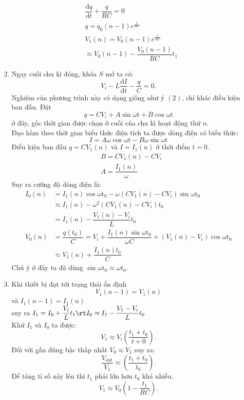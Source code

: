 \begin{loigiai}
\begin{enumerate}[1) ]
\begin{align*}
        &\dfrac{\mathrm{d}q}{\mathrm{d}t}+\dfrac{q}{RC}=0\\
        &q=q_0(n-1)e^{\frac{t}{RC}}\\
        &V_1(n)=V_0(n-1)e^{\frac{t}{RC}}\\
        &\approx V_0(n-1)-\dfrac{V_0(n-1)}{RC}t_1
    \end{align*}
    \item Ngay cuối chu kì đóng, khóa $S$ mở ta có:
    \[V_{i}-L\dfrac{\mathrm{d}I}{\mathrm{d}t}-\dfrac{q}{C}=0.\]
    Nghiệm của phương trình này có dạng giống như ý $(2)$, chỉ khác điều kiện ban đầu. Đặt
    \[q=CV_{i}+A\mathrm{\sin{\omega t}}+B\mathrm{\cos{\omega t}}\]
    ở đây, gốc thời gian được chọn ở cuối của chu kì hoạt động thứ $n$.\\
    Đạo hàm theo thời gian biểu thức điện tích ta được dòng điện có biểu thức:
    \[I=A\omega\mathrm{\cos{\omega t}}-B\omega\mathrm{\sin{\omega t}}\]
    Điều kiện ban đầu $q=CV_{1}(n)$ và $I=I_1(n)$ ở thời điểm $t=0$.
    \begin{align*}
        &B=CV_1(n)-CV_{i}\\
        &A=\dfrac{I_1(n)}{\omega}
    \end{align*}
    Suy ra cường độ dòng điện là:
    \begin{align*}
        I_0(n)&=I_1(n)\mathrm{\cos{\omega t_0}}-\omega(CV_1(n)-CV_{i})\mathrm{\sin{\omega t_0}}\\
        &\approx I_1(n)-\omega^2(CV_1(n)-CV_{i})t_0\\
        &=I_1(n)-\dfrac{V_1(n)-V_{i}}{L}t_0\\
        V_0(n)&=\dfrac{q(t_0)}{C}=V_{i}+\dfrac{I_1(n)\mathrm{\sin{\omega t_0}}}{\omega C}+(V_1(n)-V_{i})\mathrm{\cos{\omega t_0}}\\
        &\approx V_1(n) + \dfrac{I_1(n)t_0}{C}
    \end{align*}
    Chú ý ở đây ta đã dùng $\mathrm{\sin{\omega t_0}}\approx\omega t_0$.
    \item Khi thiết bị đạt tới trạng thái ổn định
    \[V_1(n-1)=V_1(n)\]
    và $I_1(n-1)=I_1(n)$\\
    suy ra $I_1=I_0+\dfrac{V_{i}}{L}t_1\rt I_0\approx I_1-\dfrac{V_1-V_{i}}{L}t_0$\\
    Khử $I_1$ và $I_0$ ta được:
    \[V_1\approx V_{i}\left(\dfrac{t_1+t_0}{t+0}\right).\]
    Đối với gần đúng bậc thấp nhất $V_0\approx V_1$ suy ra:
    \[\dfrac{V_{\text{out}}}{V_1}\approx\left(\dfrac{t_1+t_0}{t_0}\right).\]
    Để tăng tỉ số này lên thì $t_1$ phải lớn hơn $t_0$ khá nhiều.
    \[V_1\approx V_0\left(1-\dfrac{t_1}{RC}\right).\]

\end{enumerate}
\end{loigiai}
